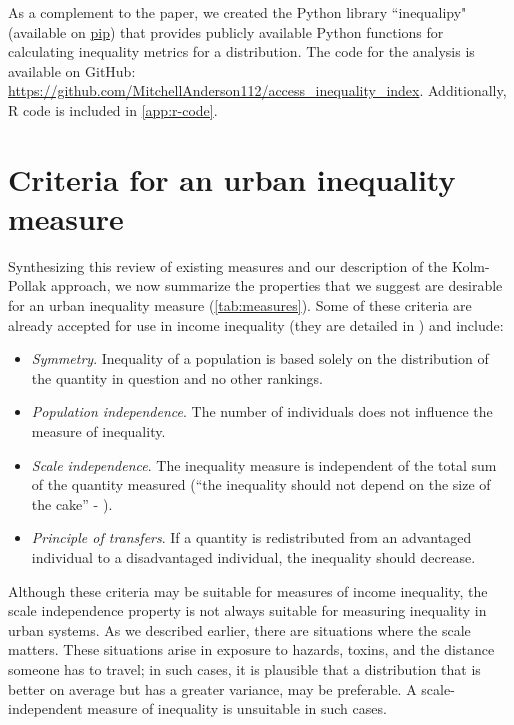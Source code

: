 \documentclass[final,3p,times,onecolumn,sort&compress]{elsarticle}
\begin{document}
As a complement to the paper, we created the Python library ``inequalipy" (available on \href{https://pypi.org/project/inequalipy/}{pip}) that provides publicly available Python functions for calculating inequality metrics for a distribution. The code for the analysis is available on GitHub: \url{https://github.com/MitchellAnderson112/access_inequality_index}. Additionally, R code is included in \autoref{app:r-code}.


\section{Criteria for an urban inequality measure}
\label{sec:criteria}

Synthesizing this review of existing measures and our description of the Kolm-Pollak approach, we now summarize the properties that we suggest are desirable for an urban inequality measure (\autoref{tab:measures}).
Some of these criteria are already accepted for use in income inequality
(they are detailed in \cite{Adger1997-tu, Blackwood1994-ie, Fields1978-tb}) and include:

\begin{itemize}
    \item \textit{Symmetry}. Inequality of a population is based solely on the distribution of the quantity in question and no other rankings.
    \item \textit{Population independence}. The number of individuals does not influence the measure of inequality.
    \item \textit{Scale independence}. The inequality measure is independent of the total sum of the quantity measured (``the inequality should not depend on the size of the cake'' - \cite{Adger1997-tu}).
    \item \textit{Principle of transfers}. If a quantity is redistributed from an advantaged individual to a disadvantaged individual, the inequality should decrease.
\end{itemize}

Although these criteria may be suitable for measures of income inequality, the scale independence property is not always suitable for measuring inequality in urban systems.
As we described earlier, there are situations where the scale matters. 
These situations arise in exposure to hazards, toxins, and the distance someone has to travel; in such cases, it is plausible that a distribution that is better on average but has a greater variance, may be preferable.
A scale-independent measure of inequality is unsuitable in such cases.
\end{document}
